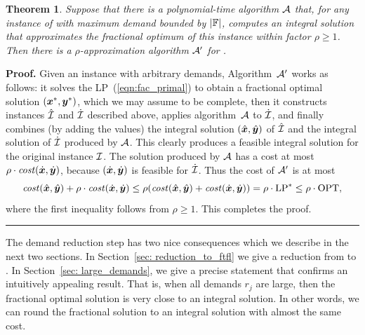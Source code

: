 \documentclass[oneside,final]{ucr}
\newtheorem{theorem}{Theorem}
\newenvironment{proof}[1][Proof]{\textbf{#1.} }{\ \rule{0.5em}{0.5em}}
\begin{document}

\begin{theorem}\label{thm: reduction to polynomial}
  Suppose that there is a polynomial-time algorithm $\calA$
  that, for any instance of {\FTFP} with maximum demand
  bounded by $|\mathbb{F}|$, computes an integral solution
  that approximates the fractional optimum of this instance
  within factor $\rho\geq 1$.  Then there is a
  $\rho$-approximation algorithm $\calA'$ for {\FTFP}.
\end{theorem}
\begin{proof}
  Given an {\FTFP} instance with arbitrary demands,
  Algorithm~$\calA'$ works as follows: it solves the
  LP~(\ref{eqn:fac_primal}) to obtain a fractional optimal
  solution $(\boldsymbol{x}^\ast,\boldsymbol{y}^\ast)$, which we may assume to
  be complete, then it constructs instances $\hatcalI$ and
  $\dotcalI$ described above, applies algorithm~$\calA$ to
  $\dotcalI$, and finally combines (by adding the values)
  the integral solution $(\hat{\boldsymbol{x}}, \hat{\boldsymbol{y}})$ of $\hatcalI$
  and the integral solution of $\dotcalI$ produced by
  $\calA$. This clearly produces a feasible integral
  solution for the original instance $\mathcal{I}$.  The solution
  produced by $\calA$ has a cost at most
  $\rho\cdot{\it cost}(\dot{\boldsymbol{x}},\dot{\boldsymbol{y}})$, because
  $(\dot{\boldsymbol{x}},\dot{\boldsymbol{y}})$ is feasible for $\dotcalI$. Thus the
  cost of $\calA'$ is at most
% 
\begin{equation*}
 {\it cost}(\hat{\boldsymbol{x}}, \hat{\boldsymbol{y}}) + \rho\cdot{\it cost}(\dot{\boldsymbol{x}},\dot{\boldsymbol{y}})
	\le
 \rho({\it cost}(\hat{\boldsymbol{x}}, \hat{\boldsymbol{y}}) + {\it cost}(\dot{\boldsymbol{x}},\dot{\boldsymbol{y}}))
		= \rho\cdot\mbox{\rm LP}^\ast \le \rho\cdot\mbox{\rm OPT},
\end{equation*}
%
where the first inequality follows from $\rho\geq 1$. This completes
the proof.
\end{proof}

The demand reduction step has two nice consequences which we
describe in the next two sections. In Section~\ref{sec:
  reduction_to_ftfl} we give a reduction from {\FTFP} to
{\FTFL}. In Section~\ref{sec: large_demands}, we give a
precise statement that confirms an intuitively appealing
result. That is, when all demands $r_j$ are large, then the
fractional optimal solution is very close to an integral
solution. In other words, we can round the fractional
solution to an integral solution with almost the same cost.
\end{document}
